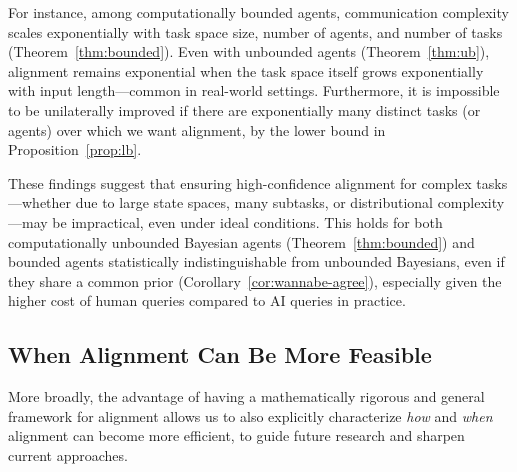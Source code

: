 For instance, among computationally bounded agents, communication complexity scales exponentially with task space size, number of agents, and number of tasks (Theorem~\ref{thm:bounded}). 
Even with unbounded agents (Theorem~\ref{thm:ub}), alignment remains exponential when the task space itself grows exponentially with input length---common in real-world settings.
Furthermore, it is impossible to be unilaterally improved if there are exponentially many distinct tasks (or agents) over which we want alignment, by the lower bound in Proposition~\ref{prop:lb}.

These findings suggest that ensuring high-confidence alignment for complex tasks---whether due to large state spaces, many subtasks, or distributional complexity---may be impractical, even under ideal conditions.
This holds for both computationally unbounded Bayesian agents (Theorem~\ref{thm:bounded}) and bounded agents statistically indistinguishable from unbounded Bayesians, even if they share a common prior (Corollary~\ref{cor:wannabe-agree}), especially given the higher cost of human queries compared to AI queries in practice.

\subsection{When Alignment Can Be More Feasible}
\label{ss:discussion-efficient}
More broadly, the advantage of having a mathematically rigorous and general framework for alignment allows us to also explicitly characterize \emph{how} and \emph{when} alignment can become more efficient, to guide future research and sharpen current approaches.

